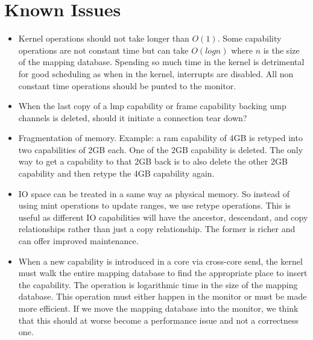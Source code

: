 \documentclass[a4paper,twoside]{report} %
\begin{document}
\chapter{Known Issues}\label{chap:known_issues}
\begin{itemize}

\item Kernel operations should not take longer than $O(1)$.  Some
  capability operations are not constant time but can take $O(log n)$
  where $n$ is the size of the mapping database. Spending so much time
  in the kernel is detrimental for good scheduling as when in the
  kernel, interrupts are disabled. All non constant time operations
  should be punted to the monitor.

\item When the last copy of a lmp capability or frame capability
  backing ump channels is deleted, should it initiate a connection
  tear down?

\item Fragmentation of memory. Example: a ram capability of 4GB is
  retyped into two capabilities of 2GB each. One of the 2GB capability
  is deleted. The only way to get a capability to that 2GB back is to
  also delete the other 2GB capability and then retype the 4GB
  capability again.

\item IO space can be treated in a same way as physical memory. So
  instead of using mint operations to update ranges, we use retype
  operations. This is useful as different IO capabilities will have
  the ancestor, descendant, and copy relationships rather than just a
  copy relationship. The former is richer and can offer improved
  maintenance.

\item When a new capability is introduced in a core via cross-core
  send, the kernel must walk the entire mapping database to find the
  appropriate place to insert the capability. The operation is
  logarithmic time in the size of the mapping database. This
  operation must either happen in the monitor or must be made more
  efficient. If we move the mapping database into the monitor, we
  think that this should at worse become a performance issue and not
  a correctness one.

\end{itemize}



\end{document}
